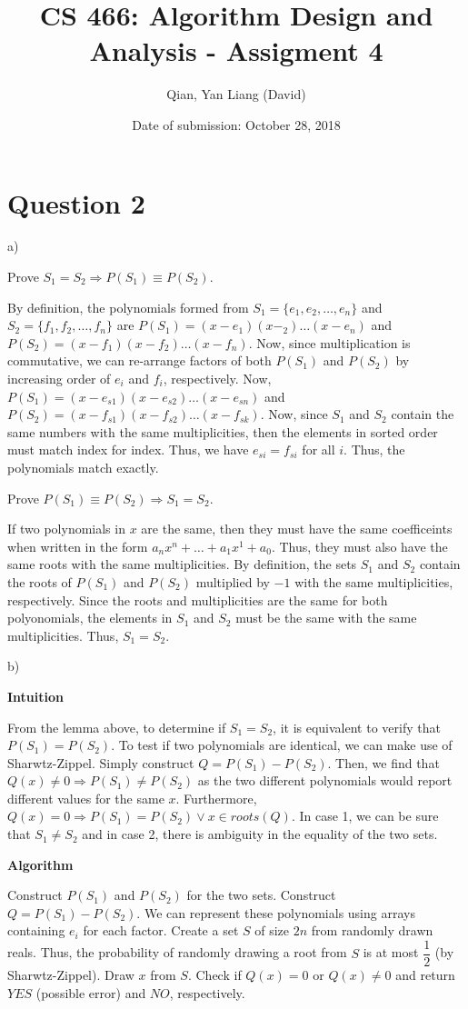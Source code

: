 \documentclass{article}
\title{CS 466: Algorithm Design and Analysis - Assigment 4}
\author{Qian, Yan Liang (David)}
\date{Date of submission: October 28, 2018}
\begin{document}
\newpage

\section{Question 2}

a)

Prove $S_1 = S_2 \Rightarrow P(S_1) \equiv P(S_2)$.

By definition, the polynomials formed from $S_1 = \{e_1, e_2, \ldots, e_n \}$ and $S_2 = \{f_1, f_2, \ldots, f_n\}$ are
$P(S_1) = (x - e_1)(x - _2)\ldots(x - e_n)$ and $P(S_2) = (x - f_1)(x - f_2)\ldots(x - f_n)$. Now, since multiplication
is commutative, we can re-arrange factors of both $P(S_1)$ and $P(S_2)$ by increasing order of $e_i$ and $f_i$,
respectively. Now, $P(S_1) = (x - e_{s1})(x - e_{s2})\ldots(x - e_{sn})$ and $P(S_2) = (x - f_{s1})(x - f_{s2})\ldots(x -
f_{sk})$.  Now, since $S_1$ and $S_2$ contain the same numbers with the same multiplicities, then the elements in sorted
order must match index for index. Thus, we have $e_{si} = f_{si}$ for all $i$. Thus, the polynomials match exactly.

Prove $P(S_1) \equiv P(S_2) \Rightarrow S_1 = S_2$.

If two polynomials in $x$ are the same, then they must have the same coefficeints when written in the form $a_n x^n +
\ldots + a_1 x^1 + a_0$. Thus, they must also have the same roots with the same multiplicities.  By definition, the sets
$S_1$ and $S_2$ contain the roots of $P(S_1)$ and $P(S_2)$ multiplied by $-1$ with the same multiplicities,
respectively. Since the roots and multiplicities are the same for both polyonomials, the elements in $S_1$ and $S_2$
must be the same with the same multiplicities. Thus, $S_1 = S_2$.


b)

\textbf{Intuition}

From the lemma above, to determine if $S_1 = S_2$, it is equivalent to verify that $P(S_1) = P(S_2)$. To test if two
polynomials are identical, we can make use of Sharwtz-Zippel. Simply construct $Q = P(S_1) - P(S_2)$. Then, we find that
$Q(x) \neq 0 \Rightarrow P(S_1) \neq P(S_2)$ as the two different polynomials would report different values for the same
$x$. Furthermore, $Q(x) = 0 \Rightarrow P(S_1) = P(S_2) \lor x \in roots(Q)$. In case 1, we can be sure that $S_1 \neq
S_2$ and in case 2, there is ambiguity in the equality of the two sets.

\textbf{Algorithm}

Construct $P(S_1)$ and $P(S_2)$ for the two sets. Construct $Q = P(S_1) - P(S_2)$. We can represent these polynomials
using arrays containing $e_i$ for each factor. Create a set $S$ of size $2n$ from randomly drawn reals. Thus, the
probability of randomly drawing a root from $S$ is at most $\dfrac{1}{2}$ (by Sharwtz-Zippel). Draw $x$ from $S$. Check
if $Q(x) = 0$ or $Q(x) \neq 0$ and return $YES$ (possible error) and $NO$, respectively.
\end{document}
